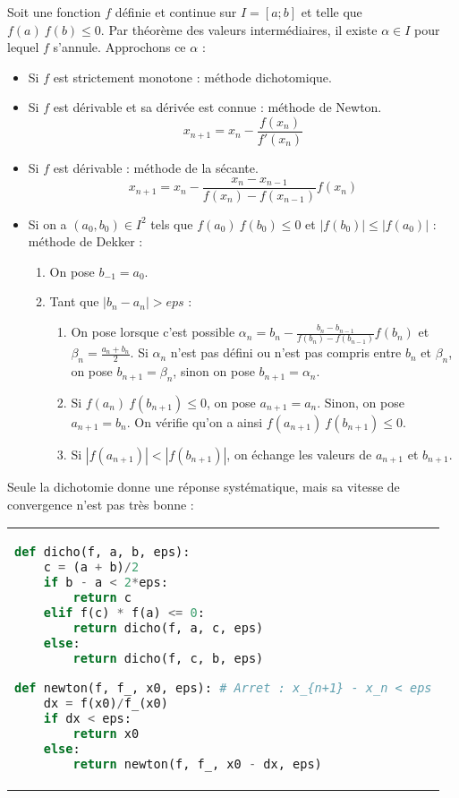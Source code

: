 \documentclass{hibiscus}
\begin{document}
\par Soit une fonction $f$ définie et continue sur $I = [a; b]$ et telle que $f(a)\:f(b) \leq 0$. Par théorème des valeurs intermédiaires, il existe $\alpha \in I$ pour lequel $f$ s'annule. Approchons ce $\alpha$ :

\begin{itemize}
\item Si $f$ est strictement monotone : méthode dichotomique.
\item Si $f$ est dérivable et sa dérivée est connue : méthode de Newton.
$$ x_{n+1} = x_n - \frac{f(x_n)}{f'(x_n)}$$
\item Si $f$ est dérivable : méthode de la sécante.
$$ x_{n+1} = x_n - \frac{x_n - x_{n-1}}{f(x_n) - f(x_{n-1})}f(x_n)$$
\item Si on a $(a_0, b_0) \in I^2$ tels que $f(a_0)\:f(b_0) \leq 0$ et $|f(b_0)| \leq |f(a_0)|$ : méthode de Dekker :
    \begin{enumerate}
    \item On pose $b_{-1} = a_0$.
    \item Tant que $|b_n - a_n| > eps$ :
        \begin{enumerate}
        \item On pose lorsque c'est possible $\alpha_n = b_n - \frac{b_n - b_{n-1}}{f(b_n) - f(b_{n-1})} f(b_n)$ et $\beta_n = \frac{a_n + b_n}{2}$. Si $\alpha_n$ n'est pas défini ou n'est pas compris entre $b_n$ et $\beta_n$, on pose $b_{n+1} = \beta_n$, sinon on pose $b_{n+1} = \alpha_n$.
        \item Si $f(a_n)\:f(b_{n+1}) \leq 0$, on pose $a_{n + 1} = a_n$. Sinon, on pose $a_{n+1} = b_n$. On vérifie qu'on a ainsi $f(a_{n+1})\:f(b_{n+1}) \leq 0$.
        \item Si $|f(a_{n+1})| < |f(b_{n+1})|$, on échange les valeurs de $a_{n+1}$ et $b_{n+1}$.
        \end{enumerate}
    \end{enumerate}
\end{itemize}

\medskip \par Seule la dichotomie donne une réponse systématique, mais sa vitesse de convergence n'est pas très bonne :

\begin{tabular}{l}
\begin{lstlisting}[language=Python]
def dicho(f, a, b, eps):
    c = (a + b)/2
    if b - a < 2*eps:
        return c
    elif f(c) * f(a) <= 0:
        return dicho(f, a, c, eps)
    else:
        return dicho(f, c, b, eps)

def newton(f, f_, x0, eps): # Arret : x_{n+1} - x_n < eps
    dx = f(x0)/f_(x0)
    if dx < eps:
        return x0
    else:
        return newton(f, f_, x0 - dx, eps)
\end{lstlisting}
\end{tabular}
\end{document}
